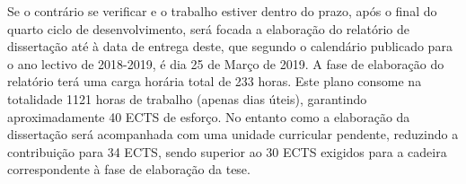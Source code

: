  Se o contrário se verificar e o trabalho estiver dentro do prazo, após o final do quarto ciclo de desenvolvimento, será focada a elaboração do relatório de dissertação até à data de entrega deste, que segundo o calendário publicado para o ano lectivo de 2018-2019, é dia 25 de Março de 2019. A fase de elaboração do relatório terá uma carga horária total de 233 horas. Este plano consome na totalidade 1121 horas de trabalho (apenas dias úteis), garantindo aproximadamente 40 ECTS de esforço. No entanto como a elaboração da dissertação será acompanhada com uma unidade curricular pendente, reduzindo a contribuição para 34 ECTS, sendo superior ao 30 ECTS exigidos para a cadeira correspondente à fase de elaboração da tese.
\label{plan}
